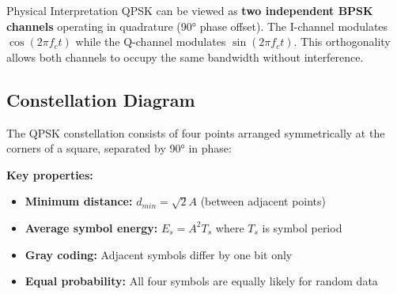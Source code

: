 \begin{calloutbox}{Physical Interpretation}
QPSK can be viewed as \textbf{two independent BPSK channels} operating in quadrature (90° phase offset). The I-channel modulates $\cos(2\pi f_c t)$ while the Q-channel modulates $\sin(2\pi f_c t)$. This orthogonality allows both channels to occupy the same bandwidth without interference.
\end{calloutbox}

\subsection{Constellation Diagram}

The QPSK constellation consists of four points arranged symmetrically at the corners of a square, separated by 90° in phase:

\begin{center}
\end{center}

\textbf{Key properties:}
\begin{itemize}
\item \textbf{Minimum distance:} $d_{min} = \sqrt{2}A$ (between adjacent points)
\item \textbf{Average symbol energy:} $E_s = A^2 T_s$ where $T_s$ is symbol period
\item \textbf{Gray coding:} Adjacent symbols differ by one bit only
\item \textbf{Equal probability:} All four symbols are equally likely for random data
\end{itemize}

